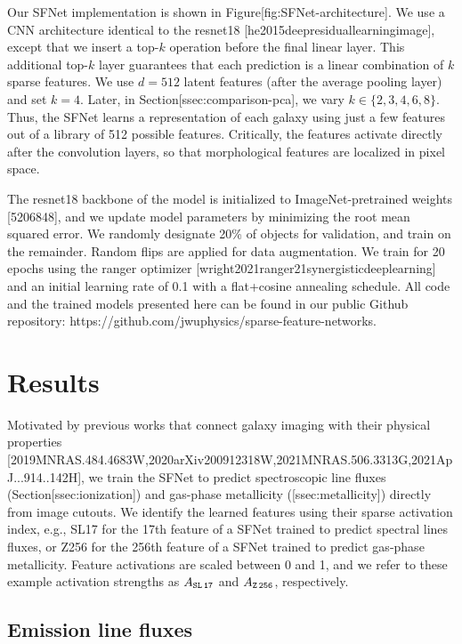 \documentclass[11pt,a4paper]{article}
\begin{document}
Our SFNet implementation is shown in Figure[fig:SFNet-architecture]. We use a CNN architecture identical to the resnet18 [he2015deepresiduallearningimage], except that we insert a top-$k$ operation before the final linear layer. This additional top-$k$ layer guarantees that each prediction is a linear combination of $k$ sparse features. We use $d=512$ latent features (after the average pooling layer) and set $k=4$. Later, in Section[ssec:comparison-pca], we vary $k \in \{2, 3, 4, 6, 8\}$. Thus, the SFNet learns a representation of each galaxy using just a few features out of a library of 512 possible features. Critically, the features activate directly after the convolution layers, so that morphological features are localized in pixel space.

The resnet18 backbone of the model is initialized to ImageNet-pretrained weights [5206848], and we update model parameters by minimizing the root mean squared error. We randomly designate 20\% of objects for validation, and train on the remainder. Random flips are applied for data augmentation. We train for 20 epochs using the ranger optimizer [wright2021ranger21synergisticdeeplearning] and an initial learning rate of 0.1 with a flat+cosine annealing schedule. All code and the trained models presented here can be found in our public Github repository: https://github.com/jwuphysics/sparse-feature-networks.

\section{Results}

Motivated by previous works that connect galaxy imaging with their physical properties [2019MNRAS.484.4683W,2020arXiv200912318W,2021MNRAS.506.3313G,2021ApJ...914..142H], we train the SFNet to predict spectroscopic line fluxes (Section[ssec:ionization]) and gas-phase metallicity ([ssec:metallicity]) directly from image cutouts. We identify the learned features using their sparse activation index, e.g., SL17 for the 17th feature of a SFNet trained to predict spectral lines fluxes, or Z256 for the 256th feature of a SFNet trained to predict gas-phase metallicity. Feature activations are scaled between 0 and 1, and we refer to these example activation strengths as $A_{\tt SL\,17}$ and $A_{\tt Z\,256}$, respectively.

\subsection{Emission line fluxes}
\end{document}
